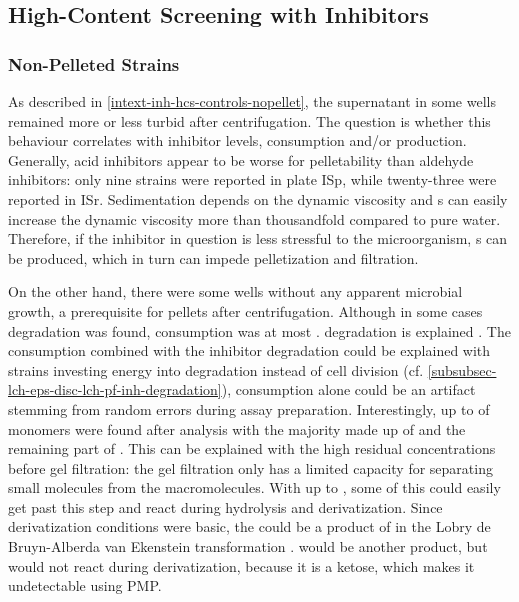 \subsection{High-Content Screening with Inhibitors\label{subsec-lch-eps-disc-inh-hcs}}
\subsubsection{Non-Pelleted Strains}
As described in \vref{intext-inh-hcs-controls-nopellet}, the supernatant in some wells remained more or less turbid after centrifugation. The question is whether this behaviour correlates with inhibitor levels, \glc{} consumption and/or \eps{} production. Generally, acid inhibitors appear to be worse for pelletability than aldehyde inhibitors: only nine strains were reported in plate ISp, while twenty-three were reported in ISr. Sedimentation depends on the dynamic viscosity and \eps{}s can easily increase the dynamic viscosity more than thousandfold compared to pure water. Therefore, if the inhibitor in question is less stressful to the microorganism, \eps{}s can be produced, which in turn can impede pelletization and filtration.

On the other hand, there were some wells without any apparent microbial growth, a prerequisite for pellets after centrifugation. Although in some cases \fur{} degradation was found, \glc{} consumption was at most . \FUR{} degradation is explained . The \glc{} consumption combined with the inhibitor degradation could be explained with strains investing energy into \fur{} degradation instead of cell division (cf. \vref{subsubsec-lch-eps-disc-lch-pf-inh-degradation}), \glc{} consumption alone could be an artifact stemming from random errors during assay preparation. Interestingly, up to  of monomers were found after \amc{} analysis with the majority made up of \glc{} and the remaining part of \man{}. This can be explained with the high residual \glc{} concentrations before gel filtration: the gel filtration only has a limited capacity for separating small molecules from the macromolecules. With up to  \glc{}, some of this could easily get past this step and react during hydrolysis and derivatization. Since derivatization conditions were basic, the \man{} could be a product of \glc{} in the Lobry de Bruyn-Alberda van Ekenstein transformation \cite{Angyal2001}. \FRC{} would be another product, but would not react during derivatization, because it is a ketose, which makes it undetectable using PMP.


